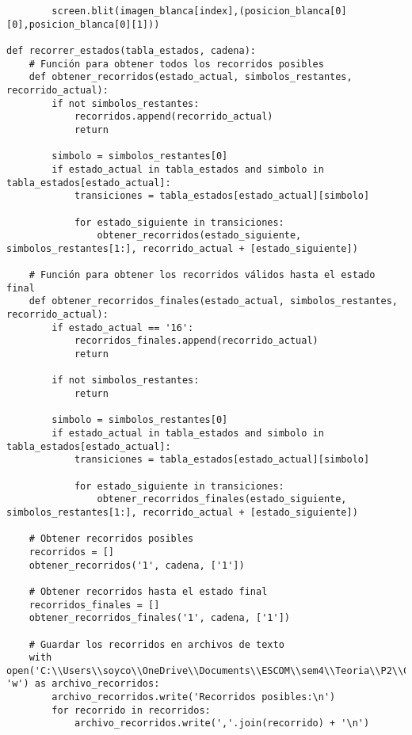 \begin{lstlisting}
        screen.blit(imagen_blanca[index],(posicion_blanca[0][0],posicion_blanca[0][1]))
           
def recorrer_estados(tabla_estados, cadena):
    # Función para obtener todos los recorridos posibles
    def obtener_recorridos(estado_actual, simbolos_restantes, recorrido_actual):
        if not simbolos_restantes:
            recorridos.append(recorrido_actual)
            return

        simbolo = simbolos_restantes[0]
        if estado_actual in tabla_estados and simbolo in tabla_estados[estado_actual]:
            transiciones = tabla_estados[estado_actual][simbolo]

            for estado_siguiente in transiciones:
                obtener_recorridos(estado_siguiente, simbolos_restantes[1:], recorrido_actual + [estado_siguiente])

    # Función para obtener los recorridos válidos hasta el estado final
    def obtener_recorridos_finales(estado_actual, simbolos_restantes, recorrido_actual):
        if estado_actual == '16':
            recorridos_finales.append(recorrido_actual)
            return

        if not simbolos_restantes:
            return

        simbolo = simbolos_restantes[0]
        if estado_actual in tabla_estados and simbolo in tabla_estados[estado_actual]:
            transiciones = tabla_estados[estado_actual][simbolo]

            for estado_siguiente in transiciones:
                obtener_recorridos_finales(estado_siguiente, simbolos_restantes[1:], recorrido_actual + [estado_siguiente])

    # Obtener recorridos posibles
    recorridos = []
    obtener_recorridos('1', cadena, ['1'])

    # Obtener recorridos hasta el estado final
    recorridos_finales = []
    obtener_recorridos_finales('1', cadena, ['1'])

    # Guardar los recorridos en archivos de texto
    with open('C:\\Users\\soyco\\OneDrive\\Documents\\ESCOM\\sem4\\Teoria\\P2\\Chess\\output\\recorridos_blanca.txt', 'w') as archivo_recorridos:
        archivo_recorridos.write('Recorridos posibles:\n')
        for recorrido in recorridos:
            archivo_recorridos.write(','.join(recorrido) + '\n')


\end{lstlisting}
